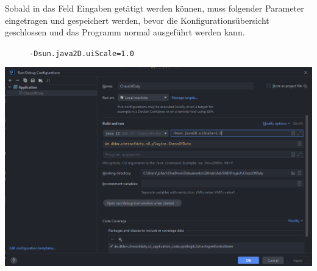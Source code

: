 Sobald in das Feld Eingaben getätigt werden können, muss folgender Parameter eingetragen und gespeichert werden, bevor die Konfigurationsübersicht geschlossen und das Programm normal ausgeführt werden kann.  
\begin{figure}[h!]
    \centering
    \texttt{-Dsun.java2D.uiScale=1.0}
\end{figure}

\begin{minipage}{\linewidth}
    \centering
    \includegraphics[scale=0.45]{Bilder/erklaerung_02.PNG}
\end{minipage}


